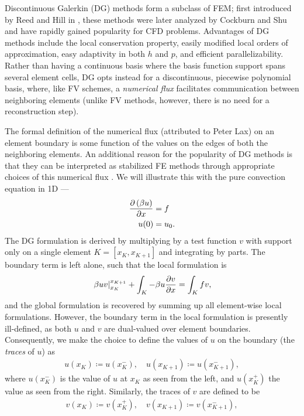 Discontinuous Galerkin (DG) methods form a subclass of FEM; first introduced by Reed and Hill in \cite{Reed:73}, these methods were later analyzed by Cockburn and Shu \cite{CockburnShu:DG} and have rapidly gained popularity for CFD problems. Advantages of DG methods include the local conservation property, easily modified local orders of approximation, easy adaptivity in both $h$ and $p$, and efficient parallelizability. Rather than having a continuous basis where the basis function support spans several element cells, DG opts instead for a discontinuous, piecewise polynomial basis, where, like FV schemes, a \emph{numerical flux} facilitates communication between neighboring elements (unlike FV methods, however, there is no need for a reconstruction step). 

The formal definition of the numerical flux (attributed to Peter Lax) on an element boundary is some function of the values on the edges of both the neighboring elements.  An additional reason for the popularity of DG methods is that they can be interpreted as stabilized FE methods through appropriate choices of this numerical flux \cite{Brezzi20063293}. We will illustrate this with the pure convection equation in 1D ---
\begin{align*}
\pd{\left(\beta u\right)}{x} &= f\\
u(0) &= u_0.
\end{align*}
The DG formulation is derived by multiplying by a test function $v$ with support only on a single element $K = [x_K,x_{K+1}]$ and integrating by parts. The boundary term is left alone, such that the local formulation is 
\[
\left.\beta u v\right|_{x_K}^{x_{K+1}} + \int_K -\beta u \pd{v}{x} = \int_K f v,
\]
and the global formulation is recovered by summing up all element-wise local formulations. However, the boundary term in the local formulation is presently ill-defined, as both $u$ and $v$ are dual-valued over element boundaries. Consequently, we make the choice to define the values of $u$ on the boundary (the \emph{traces} of $u$) as
\begin{align*}
u(x_K) \coloneqq u(x_K^-), \quad u(x_{K+1}) \coloneqq u(x_{K+1}^-),
\end{align*}
where $u(x_K^-)$ is the value of $u$ at $x_K$ as seen from the left, and $u(x_K^+)$ the value as seen from the right. Similarly, the traces of $v$ are defined to be
\begin{align*}
v(x_K) \coloneqq v(x_K^+), \quad v(x_{K+1}) \coloneqq v(x_{K+1}^-),
\end{align*}
